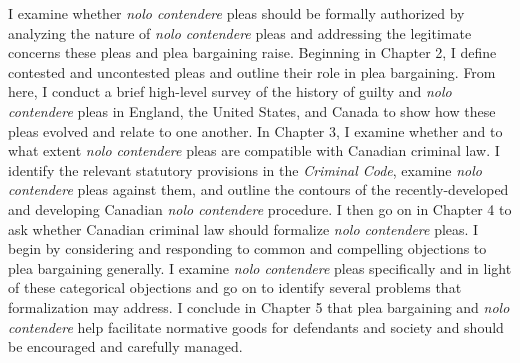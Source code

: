 I examine whether \textit{nolo contendere} pleas should be formally authorized by analyzing the nature of \textit{nolo contendere} pleas and addressing the legitimate concerns these pleas and plea bargaining raise. Beginning in Chapter 2, I define contested and uncontested pleas and outline their role in plea bargaining. From here, I conduct a brief high-level survey of the history of guilty and \textit{nolo contendere} pleas in England, the United States, and Canada to show how these pleas evolved and relate to one another. In Chapter 3, I examine whether and to what extent \textit{nolo contendere} pleas are compatible with Canadian criminal law. I identify the relevant statutory provisions in the \textit{Criminal Code}, examine \textit{nolo contendere} pleas against them, and outline the contours of the recently-developed and developing Canadian \textit{nolo contendere} procedure. I then go on in Chapter 4 to ask whether Canadian criminal law should formalize \textit{nolo contendere} pleas. I begin by considering and responding to common and compelling objections to plea bargaining generally. I examine \textit{nolo contendere} pleas specifically and in light of these categorical objections and go on to identify several problems that formalization may address. I conclude in Chapter 5 that plea bargaining and \textit{nolo contendere} help facilitate normative goods for defendants and society and should be encouraged and carefully managed.